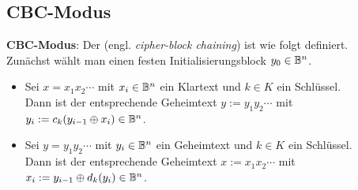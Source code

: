 \pagebreak

\subsection{%
    CBC-Modus%
}

\textbf{CBC-Modus}:
Der  (engl. \emph{cipher-block chaining}) ist wie folgt definiert.\\
Zunächst wählt man einen festen Initialisierungsblock $y_0 \in \mathbb{B}^n$.
\begin{itemize}
    \item
    Sei $x = x_1 x_2 \cdots$ mit $x_i \in \mathbb{B}^n$ ein Klartext und $k \in K$ ein Schlüssel.\\
    Dann ist der entsprechende Geheimtext $y := y_1 y_2 \cdots$ mit
    $y_i := c_k(y_{i-1} \oplus x_i) \in \mathbb{B}^n$.

    \item
    Sei $y = y_1 y_2 \cdots$ mit $y_i \in \mathbb{B}^n$ ein Geheimtext und $k \in K$ ein Schlüssel.\\
    Dann ist der entsprechende Geheimtext $x := x_1 x_2 \cdots$ mit
    $x_i := y_{i-1} \oplus d_k(y_i) \in \mathbb{B}^n$.
\end{itemize}

